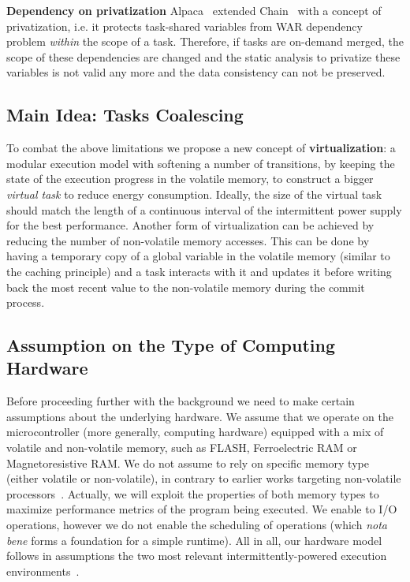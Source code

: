 	\textbf{Dependency on privatization} Alpaca~\cite{alpaca} extended Chain~\cite{chain} with a concept of privatization, i.e. it protects task-shared variables from WAR dependency problem \emph{within} the scope of a task. Therefore, if tasks are on-demand merged, the scope of these dependencies are changed and the static analysis to privatize these variables is not valid any more and the data consistency can not be preserved.


\subsection{Main Idea: Tasks Coalescing}

To combat the above limitations we propose a new concept of \textbf{virtualization}: a modular execution model with softening a number of transitions, by keeping the state of the execution progress in the volatile memory, to construct a bigger \emph{virtual task} to reduce energy consumption. Ideally, the size of the virtual task should match the length of a continuous interval of the intermittent power supply for the best performance. Another form of virtualization can be achieved by reducing the number of non-volatile memory accesses. This can be done by having a temporary copy of a global variable in the volatile memory (similar to the caching principle) and a task interacts with it and updates it before writing back the most recent value to the non-volatile memory during the commit process.

\subsection{Assumption on the Type of Computing Hardware}
\label{sec:background_hardware}

Before proceeding further with the background we need to make certain assumptions about the underlying hardware. We assume that we operate on the microcontroller (more generally, computing hardware) equipped with a mix of volatile and non-volatile memory, such as FLASH, Ferroelectric RAM or Magnetoresistive RAM. We do not assume to rely on specific memory type (either volatile or non-volatile), in contrary to earlier works targeting non-volatile processors~\cite{su_date_2017,ratchet,quickrecall,nvp}. Actually, we will exploit the properties of both memory types to maximize performance metrics of the program being executed. We enable to I/O operations, however we do not enable the scheduling of operations (which \emph{nota bene} forms a foundation for a simple runtime). All in all, our hardware model follows in assumptions the two most relevant intermittently-powered execution environments~\cite{alpaca,chain}. 

